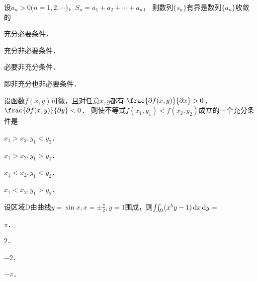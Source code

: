 \documentclass[plain,noanswer,medmath]{../../template/jnuexam}
\begin{document}










\begin{problem}
设$a_n > 0$($n = 1,2, \cdots$)，$S_n = a_1 + a_2 + \cdots + a_n$，
则数列$\{s_n\}$有界是数列$\{a_n\}$收敛的\pickout{}
\begin{abcd}
\item 充分必要条件．
\item 充分非必要条件．
\item 必要非充分条件．
\item 即非充分也非必要条件．
\end{abcd}
\end{problem}




\begin{problem}
设函数$f\left(x,y \right)$可微，且对任意$x,y$都有
$\frac{\pd f(x,y)}{\pdx} > 0$，$\frac{\pd f(x,y)}{\pdy} < 0$．
则使不等式$f\left(x_1,y_1 \right) < f\left(x_2,y_2 \right)$成立的一个充分条件是
\begin{abcd}
\item $x_1 > x_2,y_1 < y_2$．
\item $x_1 > x_2,y_1 > y_1$．
\item $x_1 < x_2,y_1 < y_2$．
\item $x_1 < x_2,y_1 > y_2$．
\end{abcd}
\end{problem}


\begin{problem}
设区域D由曲线$y = \sin x,x = \pm \frac{\pi}{2},y = 1$围成，则$\iint_D (x^5 y - 1)\mathop{}\!\mathrm{d} x\mathop{}\!\mathrm{d} y =$\pickout{}
\begin{abcd}
\item $\pi$．
\item $2$．
\item $- 2$．
\item $- \pi$．
\end{abcd}
\end{problem}






\end{document}
